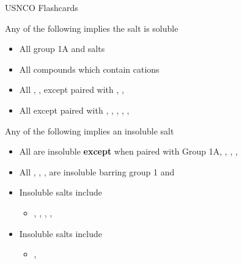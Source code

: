 \documentclass[9pt]{extarticle}
\begin{document}
\begin{center}
    \hspace{0pt}
    \vfill
    \Large USNCO Flashcards
    \vfill
    \hspace{0pt}
\end{center}
\newpage

Any of the following implies the salt is soluble
\begin{itemize}
    \item All group 1A and  salts
    \item All compounds which contain cations 
    \item All , ,  except paired with , , 
    \item All  except paired with , , , , , 
\end{itemize}
\newpage
Any of the following implies an insoluble salt
\begin{itemize}
    \item All  are insoluble \textbf{except} when paired with Group 1A, , , , 
    \item All , , ,  are insoluble barring group 1 and 
    \item Insoluble  salts include
    \begin{itemize}
        \item {}, , , , 
    \end{itemize}
    \item Insoluble  salts include
    \begin{itemize}
        \item {}, 
    \end{itemize}
\end{itemize}
\end{document}
